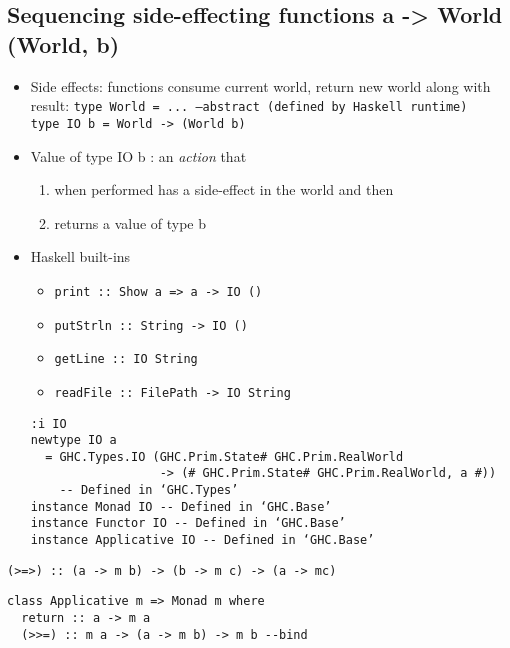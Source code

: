 \documentclass{article}
\newcommand{\Haskell}[1]{\texttt{#1}}
\begin{document}
\subsection{Sequencing side-effecting functions a -> World (World, b)}
\begin{itemize}
\item Side effects: functions consume current world, return new world along with result:
\Haskell{type World = ... --abstract (defined by Haskell runtime)}\\
\Haskell{type IO b = World -> (World b)}
\item Value of type IO b : an \emph{action} that
\begin{enumerate}[1.]
\item when performed has a side-effect in the world and then
\item returns a value of type b
\end{enumerate}
\item Haskell built-ins
\begin{itemize}
\item \Haskell{print :: Show a => a -> IO ()}
\item \Haskell{putStrln :: String -> IO ()}
\item \Haskell{getLine :: IO String}
\item \Haskell{readFile :: FilePath -> IO String}
\end{itemize}
\begin{verbatim}
:i IO
newtype IO a
  = GHC.Types.IO (GHC.Prim.State# GHC.Prim.RealWorld
                  -> (# GHC.Prim.State# GHC.Prim.RealWorld, a #))
  	-- Defined in ‘GHC.Types’
instance Monad IO -- Defined in ‘GHC.Base’
instance Functor IO -- Defined in ‘GHC.Base’
instance Applicative IO -- Defined in ‘GHC.Base’
\end{verbatim}
\end{itemize}
\Haskell{(>=>) :: (a -> m b) -> (b -> m c) -> (a -> mc)}
\begin{verbatim}
class Applicative m => Monad m where
  return :: a -> m a
  (>>=) :: m a -> (a -> m b) -> m b --bind
\end{verbatim}
\end{document}
